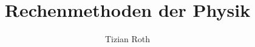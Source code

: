 \title{Rechenmethoden der Physik}
\author{Tizian Roth}



\noindent
\maketitle
\tableofcontents




